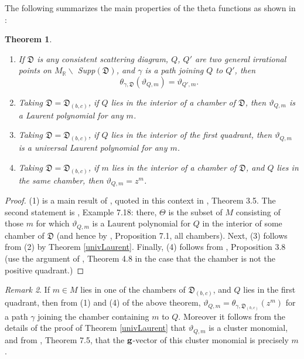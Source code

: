 \documentclass[12pt]{amsart}
\newtheorem{theorem}{Theorem}[section]
\theoremstyle{remark}
\newtheorem{remark}[theorem]{Remark}
\numberwithin{equation}{section}
\newcommand{\RR}{\mathbb{R}}
\newcommand{\DD}{\mathfrak{D}}
\begin{document}
The following summarizes the main properties of the theta functions as shown in
\cite{GHKK}:
\begin{theorem} $ $
  \begin{enumerate}
    \item
      If $\DD$ is any consistent scattering diagram, $Q$, $Q'$ are two general
      irrational points on $M_{\RR} \backslash$ Supp$(\DD)$, and $\gamma$ is a
      path joining $Q$ to $Q'$, then 
      \[
        \theta_{\gamma, \DD }(\vartheta_{Q,m}) = \vartheta_{Q', m}. 
      \]
    
    \item 
      Taking $\DD=\DD_{(b,c)}$, if $Q$ lies in the interior of a chamber of
      $\DD$, then $\vartheta_{Q,m}$ is a Laurent polynomial for any $m$.
    
    \item 
      Taking $\DD=\DD_{(b,c)}$, if $Q$ lies in the interior of the first
      quadrant, then $\vartheta_{Q,m}$ is a universal Laurent polynomial for
      any $m$.

    \item 
      Taking $\DD=\DD_{(b,c)}$, if $m$ lies in the interior of a chamber of
      $\DD$, and $Q$ lies in the same chamber, then $\vartheta_{Q,m}=z^{m}$.
   
  \end{enumerate}
\end{theorem}

\begin{proof}
  (1) is a main result of \cite{CPS}, quoted in this context in \cite{GHKK},
  Theorem 3.5.  The second statement is \cite{GHKK}, Example 7.18: there,
  $\Theta$ is the subset of $M$ consisting of those $m$ for which
  $\vartheta_{Q,m}$ is a Laurent polynomial for $Q$ in the interior of 
  some chamber of $\DD$ (and hence by \cite{GHKK}, Proposition 7.1, all 
  chambers).
  Next, (3) follows from (2) by Theorem \ref{univLaurent}. 
  Finally, (4) follows from \cite{GHKK}, Proposition 3.8 (use the argument of
  \cite{GHKK}, Theorem 4.8 in the case that the chamber is not the positive
  quadrant.)
\end{proof}

\begin{remark} 
  \label{rk:theta functions g-vector}
  If $m\in M$ lies in one of the chambers of $\DD_{(b,c)}$, and $Q$ lies in
  the first quadrant, then from (1) and (4) of the above theorem,
  $\vartheta_{Q,m}=\theta_{\gamma,\DD_{(b,c)}}(z^{m})$ for a path $\gamma$
  joining the chamber containing $m$ to $Q$. Moreover it follows from the
  details of the proof of Theorem \ref{univLaurent} that $\vartheta_{Q,m}$ is
  a cluster monomial, and from \cite{GHKK}, Theorem 7.5, that the 
  ${\bf g}$-vector of this cluster monomial is precisely $m$. 
\end{remark}
\end{document}
